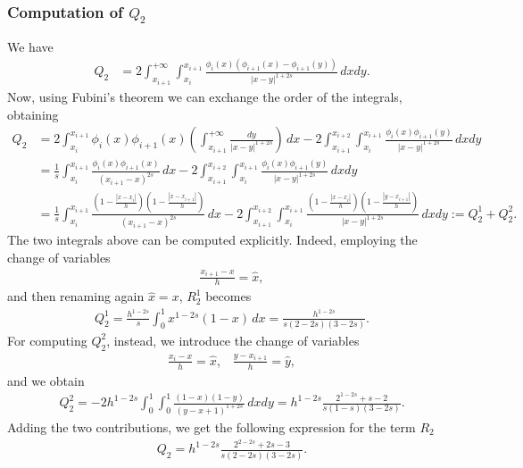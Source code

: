 \subsubsection*{Computation of $Q_2$}
We have
\begin{align*}
	Q_2 &= 2\int_{x_{i+1}}^{+\infty}\int_{x_i}^{x_{i+1}} \frac{\phi_i(x)(\phi_{i+1}(x)-\phi_{i+1}(y))}{|x-y|^{1+2s}}\,dxdy. 
\end{align*}
Now, using Fubini's theorem we can exchange the order of the integrals, obtaining 
\begin{align*}
	Q_2 &= 2\int_{x_i}^{x_{i+1}}\phi_i(x)\phi_{i+1}(x)\left(\int_{x_{i+1}}^{+\infty} \frac{dy}{|x-y|^{1+2s}}\right)\,dx - 2\int_{x_{i+1}}^{x_{i+2}}\int_{x_i}^{x_{i+1}} \frac{\phi_i(x)\phi_{i+1}(y)}{|x-y|^{1+2s}}\,dxdy 
	\\
	&= \frac{1}{s}\int_{x_i}^{x_{i+1}}\frac{\phi_i(x)\phi_{i+1}(x)}{(x_{i+1}-x)^{2s}}\,dx - 2\int_{x_{i+1}}^{x_{i+2}}\int_{x_i}^{x_{i+1}} \frac{\phi_i(x)\phi_{i+1}(y)}{|x-y|^{1+2s}}\,dxdy
	\\
	&= \frac{1}{s}\int_{x_i}^{x_{i+1}}\frac{\left(1-\frac{|x-x_i|}{h}\right)\left(1-\frac{|x-x_{i+1}|}{h}\right)}{(x_{i+1}-x)^{2s}}\,dx - 2\int_{x_{i+1}}^{x_{i+2}}\int_{x_i}^{x_{i+1}} \frac{\left(1-\frac{|x-x_i|}{h}\right)\left(1-\frac{|y-x_{i+1}|}{h}\right)}{|x-y|^{1+2s}}\,dxdy:= Q_2^1 + Q_2^2.
\end{align*}
The two integrals above can be computed explicitly. Indeed, employing the change of variables
\begin{align}\label{cv2}
	\frac{x_{i+1}-x}{h}=\hat{x},
\end{align}
and then renaming again $\hat{x}=x$, $R_2^1$ becomes
\begin{align*}
	Q_2^1=\frac{h^{1-2s}}{s}\int_0^1 x^{1-2s}(1-x)\,dx = \frac{h^{1-2s}}{s(2-2s)(3-2s)}.
\end{align*}
For computing $Q_2^2$, instead, we introduce the change of variables
\begin{align}\label{cv3}
	\frac{x_i-x}{h}=\hat{x},\;\;\;\frac{y-x_{i+1}}{h}=\hat{y},
\end{align}
and we obtain
\begin{align*}
	Q_2^2 = -2h^{1-2s}\int_0^1\int_0^1\frac{(1-x)(1-y)}{(y-x+1)^{1+2s}}\,dxdy = h^{1-2s}\frac{2^{1-2s}+s-2}{s(1-s)(3-2s)}.
\end{align*}
Adding the two contributions, we get the following expression for the term $R_2$
\begin{align}\label{Q2}
	Q_2 = h^{1-2s}\frac{2^{2-2s}+2s-3}{s(2-2s)(3-2s)}.
\end{align}
